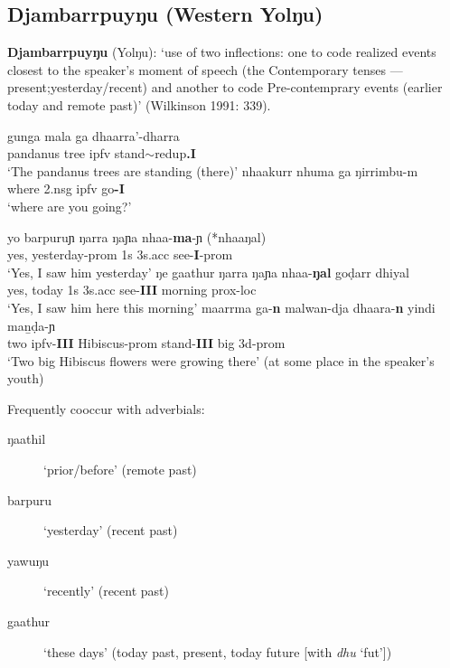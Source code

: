\documentclass[11pt]{article}
\begin{document}
\subsection*{Djambarrpuyŋu (Western Yolŋu)}
\textbf{Djambarrpuyŋu} (Yolŋu): `use of two inflections: one to code realized events closest to the speaker's moment of speech (the Contemporary tenses --- present;yesterday/recent) and another to code Pre-contemprary events (earlier today and remote past)' (Wilkinson 1991: 339).
\begin{exe}\ex\begin{xlist}
\ex\gll gunga mala ga dhaarra'-dharra\\
pandanus tree {\sc ipfv} stand$\sim${\sc redup}\textbf{.I}\\
\glt`The pandanus trees are standing (there)'
\ex\gll nhaakurr nhuma ga ŋirrimbu-m\\
where 2.nsg {\sc ipfv} go\textbf{-I}\\
`where are you going?'\end{xlist}
\ex\begin{xlist}\ex\gll yo barpuruɲ ŋarra ŋaɲa nhaa-\textbf{ma}-ɲ (*nhaaŋal)\\
yes, yesterday{\sc-prom} 1s 3s{\sc.acc} see-\textbf{I}-{\sc prom}\\
\glt`Yes, I saw him yesterday'
\ex\gll ŋe gaathur ŋarra ŋaɲa nhaa-\textbf{ŋal} goḍarr dhiyal\\
yes, today 1s 3s{\sc.acc} see-\textbf{III} morning {\sc prox-loc}\\
\glt`Yes, I saw him here this morning'
\ex\gll maarrma ga-\textbf{n} malwan-dja dhaara-\textbf{n} yindi maṉḍa-ɲ\\
two {\sc ipfv-\textbf{III}} Hibiscus-{\sc prom} stand-\textbf{III} big 3d-{\sc prom}\\
\glt`Two big Hibiscus flowers were growing there' (at some place in the speaker's youth)
\end{xlist}\end{exe}
\footnotesize
Frequently cooccur with adverbials: \begin{description}
\item[ŋaathil] `prior/before' (remote past)
\item[barpuru] `yesterday' (recent past)
\item[yawuŋu] `recently' (recent past)
\item[gaathur] `these days' (today past, present, today future [with \textit{dhu} {\sc `fut'}])
\end{description}\normalsize
\end{document}
